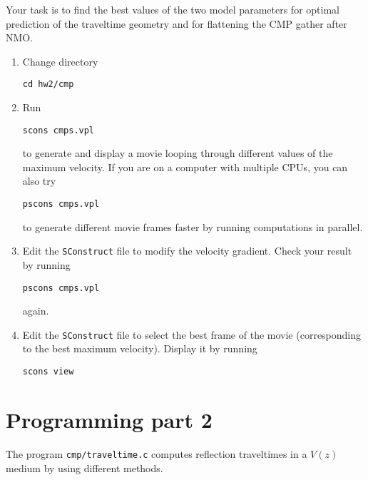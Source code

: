 Your task is to find the best values of the two model parameters for
optimal prediction of the traveltime geometry and for flattening the
CMP gather after NMO.

\begin{enumerate}
\item Change directory 
\begin{verbatim}
cd hw2/cmp
\end{verbatim}
\item Run
\begin{verbatim}
scons cmps.vpl
\end{verbatim}
to generate and display a movie looping through different values of
the maximum velocity. If you are on a computer with multiple CPUs, you
can also try
\begin{verbatim}
pscons cmps.vpl
\end{verbatim}
to generate different movie frames faster by running computations in
parallel.
\item Edit the \texttt{SConstruct} file to modify the velocity gradient. Check your result by running
\begin{verbatim}
pscons cmps.vpl
\end{verbatim}
again. 
\item Edit the \texttt{SConstruct} file to select the 
best frame of the movie (corresponding to the best maximum velocity). Display it by running
\begin{verbatim}
scons view
\end{verbatim}
\end{enumerate}

\lstset{language=python,numbers=left,numberstyle=\tiny,showstringspaces=false}


\section{Programming part 2}


The program \texttt{cmp/traveltime.c} computes reflection traveltimes
in a $V(z)$ medium by using different methods. 

